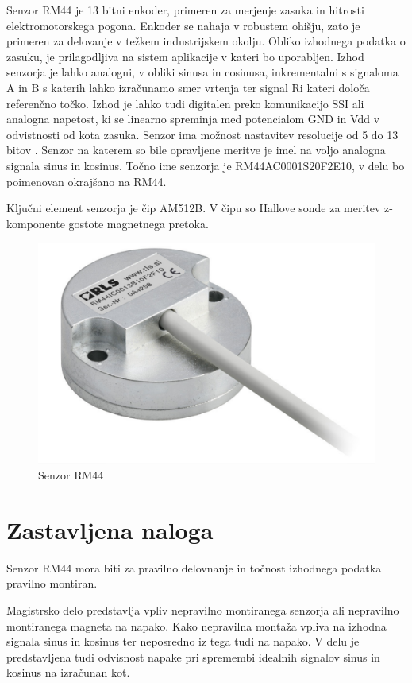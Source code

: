 Senzor RM44 je 13 bitni enkoder, primeren za merjenje zasuka in hitrosti elektromotorskega pogona.
Enkoder se nahaja v robustem ohišju, zato je primeren za delovanje v težkem industrijskem okolju.%
Obliko izhodnega podatka o zasuku, je prilagodljiva na sistem aplikacije v kateri bo uporabljen. Izhod senzorja je lahko analogni, v obliki sinusa in cosinusa, inkrementalni s signaloma A in B s katerih lahko izračunamo smer vrtenja ter signal Ri kateri določa referenčno točko. Izhod je lahko tudi digitalen preko komunikacijo SSI ali analogna napetost, ki se linearno spreminja med potencialom GND in Vdd v odvistnosti od kota zasuka. Senzor ima možnost nastavitev resolucije od 5 do 13 bitov \cite{RM44}\cite{AM8192}. Senzor na katerem so bile opravljene meritve je imel na voljo analogna signala sinus in kosinus. Točno ime senzorja je RM44AC0001S20F2E10, v delu bo poimenovan okrajšano na RM44.

Ključni element senzorja je čip AM512B. V čipu so Hallove sonde za meritev z-komponente gostote magnetnega pretoka. 

\begin{figure}[h]
	\centering
	\includegraphics[width=0.5\columnwidth]{./Slike/senzorRM44.jpg}
	\caption{Senzor RM44}
	\label{RM44}
\end{figure}



\chapter{Zastavljena naloga}

Senzor RM44 mora biti za pravilno delovnanje in točnost izhodnega podatka pravilno montiran.%

Magistrsko delo predstavlja vpliv nepravilno montiranega senzorja ali nepravilno montiranega magneta na napako. Kako nepravilna montaža vpliva na izhodna signala sinus in kosinus ter neposredno iz tega tudi na napako. V delu je predstavljena tudi odvisnost napake pri spremembi idealnih signalov sinus in kosinus na izračunan kot.

